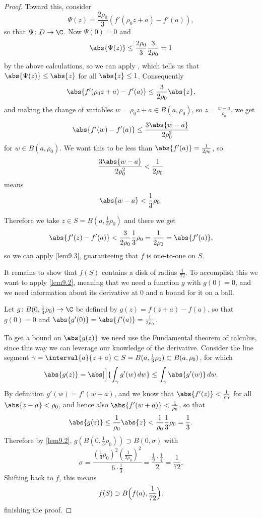 \begin{proof}
	Toward this, consider
	\[
		\Psi(z) = \frac{2 \rho_0}{3} (f'(\rho_0 z + a) - f'(a)),
	\]
	so that $\Psi \colon D \to \C$.
	Now $\Psi(0) = 0$ and
	\[
		\abs{\Psi(z)} \leq \frac{2 \rho_0}{3} \frac{3}{2 \rho_0} = 1
	\]
	by the above calculations, so we can apply , which tells us that $\abs{\Psi(z)} \leq \abs{z}$ for all $\abs{z} \leq 1$.
	Consequently
	\[
		\abs{f'(\rho_0 z + a) - f'(a)} \leq \frac{3}{2 \rho_0} \abs{z},
	\]
	and making the change of variables $w = \rho_0 z + a \in B(a, \rho_0)$, so $z = \frac{w - a}{\rho_0}$, we get
	\[
		\abs{f'(w) - f'(a)} \leq \frac{3 \abs{w - a}}{2 \rho_0^2}
	\]
	for $w \in B(a, \rho_0)$.
	We want this to be less than $\abs{f'(a)} = \frac{1}{2 \rho_0}$, so
	\[
		\frac{3 \abs{w - a}}{2 \rho_0^2} < \frac{1}{2 \rho_0}
	\]
	means
	\[
		\abs{w - a} < \frac{1}{3} \rho_0.
	\]

	Therefore we take $z \in S = B(a, \frac{1}{3} \rho_0)$ and there we get
	\[
		\abs{f'(z) - f'(a)} < \frac{3}{2 \rho_0} \frac{1}{3} \rho_0 = \frac{1}{2 \rho_0} = \abs{f'(a)},
	\]
	so we can apply \autoref{lem9.3}, guaranteeing that $f$ is one-to-one on $S$.

	It remains to show that $f(S)$ contains a disk of radius $\frac{1}{72}$.
	To accomplish this we want to apply \autoref{lem9.2}, meaning that we need a function $g$ with $g(0) = 0$, and we need information about its derivative at $0$ and a bound for it on a ball.

	Let $g \colon B(0, \frac{1}{3} \rho_0) \to \C$ be defined by $g(z) = f(z + a) - f(a)$, so that $g(0) = 0$ and $\abs{g'(0)} = \abs{f'(a)} = \frac{1}{2 \rho_0}$.

	To get a bound on $\abs{g(z)}$ we need use the Fundamental theorem of calculus, since this way we can leverage our knowledge of the derivative.
	Consider the line segment $\gamma = \interval{a}{z + a} \subset S = B(a, \frac{1}{3} \rho_0) \subset B(a, \rho_0)$, for which
	\[
		\abs{g(z)} = \abs[\Big]{\int_\gamma g'(w) \, d w} \leq \int_\gamma \abs{g'(w)} \, d w.
	\]
	By definition $g'(w) = f'(w + a)$, and we know that $\abs{f'(z)} < \frac{1}{\rho_0}$ for all $\abs{z - a} < \rho_0$, and hence also $\abs{f'(w + a)} < \frac{1}{\rho_0}$, so that
	\[
		\abs{g(z)} \leq \frac{1}{\rho_0} \abs{z} < \frac{1}{\rho_0} \frac{1}{3} \rho_0 = \frac{1}{3}.
	\]
	Therefore by \autoref{lem9.2}, $g(B(0, \frac{1}{3} \rho_0)) \supset B(0, \sigma)$ with
	\[
		\sigma = \frac{(\frac{1}{3} \rho_0)^2 (\frac{1}{2 \rho_0})^2}{6 \cdot \frac{1}{3}} = \frac{\frac{1}{9} \cdot \frac{1}{4}}{2} = \frac{1}{72}.
	\]
	Shifting back to $f$, this means
	\[
		f(S) \supset B\Bigl( f(a), \frac{1}{72} \Bigr),
	\]
	finishing the proof.
\end{proof}

